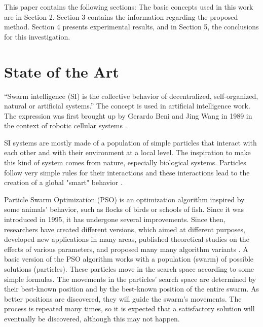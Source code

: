 \documentclass[runningheads]{llncs}
\begin{document}
This paper contains the following sections: The basic concepts used in this work are in Section 2. Section 3 contains the information regarding the proposed method. Section 4 presents experimental results, and in Section 5, the conclusions for this investigation.

\section{State of the Art}


“Swarm intelligence (SI) is the collective behavior of decentralized, self-organized, natural or artificial systems.” The concept is used in artificial intelligence work. The expression was first brought up by Gerardo Beni and Jing Wang in 1989 in the context of robotic cellular systems \cite{b4}. 

SI systems are mostly made of a population of simple particles that interact with each other and with their environment at a local level. The inspiration to make this kind of system comes from nature, especially biological systems. Particles follow very simple rules for their interactions and these interactions lead to the creation of a global "smart" behavior \cite{b5}.


Particle Swarm Optimization (PSO) is an optimization algorithm inspired by some animals' behavior, such as flocks of birds or schools of fish. Since it
was introduced in 1995, it has undergone several improvements.\cite{b1} %
Since then, researchers have created different versions, which aimed at different
purposes, developed new applications in many areas, published theoretical
studies on the effects of various parameters, and proposed many many algorithm variants \cite{b2}. A basic version of the PSO algorithm works with a population (swarm) of possible solutions (particles). These particles move in the search space according to some simple formulas. The movements in the particles' search space are determined by their best-known position and by the best-known position of the entire swarm. As better positions are discovered, they will guide the swarm's movements. The process is repeated many times, so it is expected that a satisfactory solution will eventually be discovered, although this may not happen\cite{b3}.
\end{document}
